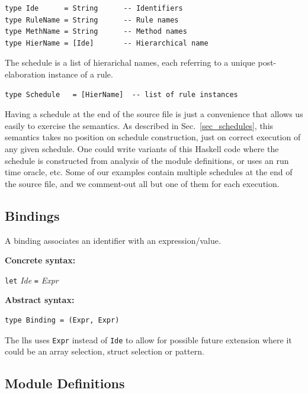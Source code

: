 \documentclass[11pt]{article}
\newcommand{\hm}{\hspace*{1em}}
\newcommand{\nterm}[1]{\emph{#1}}
\newcommand{\term}[1]{\texttt{#1}}
\newcommand{\gram}[2]{    \hm\makebox[10em][l]{\it #1}\makebox[1.5em][l]{::=}    #2}
\begin{document}
\begin{Verbatim}[frame=single, commandchars=\\\{\}]
type Ide      = String      -- Identifiers
type RuleName = String      -- Rule names
type MethName = String      -- Method names
type HierName = [Ide]       -- Hierarchical name
\end{Verbatim}

The schedule is a list of hierarichal names, each referring to a
unique post-elaboration instance of a rule.

\begin{Verbatim}[frame=single, commandchars=\\\{\}]
type Schedule   = [HierName]  -- list of rule instances
\end{Verbatim}

Having a schedule at the end of the source file is just a convenience
that allows us easily to exercise the semantics.  As described in
Sec.~\ref{sec_schedules}, this semantics takes no position on schedule
construction, just on correct execution of any given schedule.  One
could write variants of this Haskell code where the schedule is
constructed from analysis of the module definitions, or uses an run
time oracle, etc.  Some of our examples contain multiple schedules at
the end of the source file, and we comment-out all but one of them for
each execution.


\subsection{Bindings}

A binding associates an identifier with an expression/value.

{\bf Concrete syntax:}

\gram{Binding}{\term{let}  \nterm{Ide} \term{=}  \nterm{Expr}}

{\bf Abstract syntax:}

\begin{Verbatim}[frame=single, commandchars=\\\{\}]
type Binding = (Expr, Expr)
\end{Verbatim}

The lhs uses \term{Expr} instead of \term{Ide} to allow for possible
future extension where it could be an array selection, struct
selection or pattern.


\subsection{Module Definitions}
\end{document}
